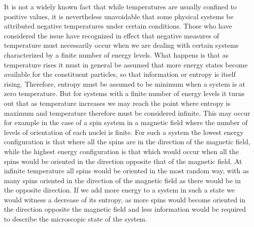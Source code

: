 \documentclass[notitlepage,12pt]{report}
\begin{document}
It is not a widely known fact that while temperatures are usually confined to positive values, it is nevertheless unavoidable that some physical systems be attributed negative temperatures under certain conditions. Those who have considered the issue have recognized in effect that negative measures of temperature must necessarily occur when we are dealing with certain systems characterized by a finite number of energy levels. What happens is that as temperature rises it must in general be assumed that more energy states become available for the constituent particles, so that information or entropy is itself rising. Therefore, entropy must be assumed to be minimum when a system is at zero temperature. But for systems with a finite number of energy levels it turns out that as temperature increases we may reach the point where entropy is maximum and temperature therefore must be considered infinite. This may occur for example in the case of a spin system in a magnetic field where the number of levels of orientation of each nuclei is finite. For such a system the lowest energy configuration is that where all the spins are in the direction of the magnetic field, while the highest energy configuration is that which would occur when all the spins would be oriented in the direction opposite that of the magnetic field. At infinite temperature all spins would be oriented in the most random way, with as many spins oriented in the direction of the magnetic field as there would be in the opposite direction. If we add more energy to a system in such a state we would witness a decrease of its entropy, as more spins would become oriented in the direction opposite the magnetic field and less information would be required to describe the microscopic state of the system.
\end{document}
